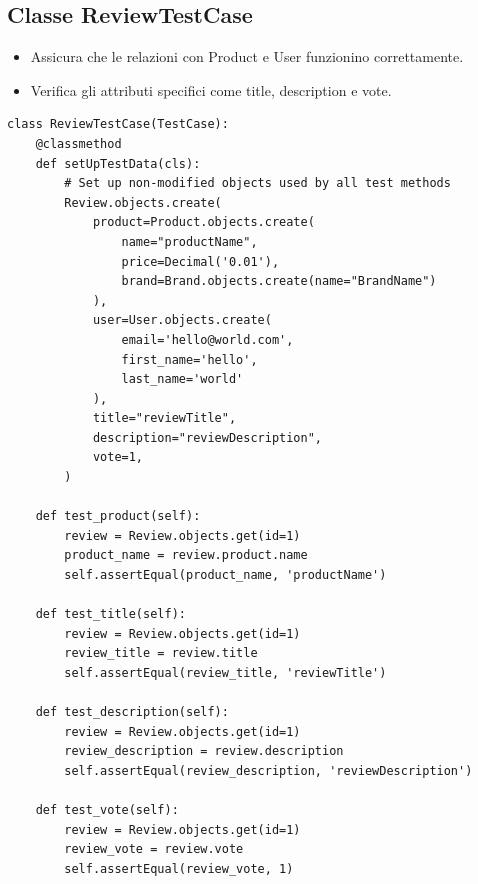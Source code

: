 \subsection{Classe ReviewTestCase}
\begin{itemize}
    \item Assicura che le relazioni con Product e User funzionino correttamente.
    \item Verifica gli attributi specifici come title, description e vote.
\end{itemize}
\begin{listing}[!ht]
\begin{verbatim}
class ReviewTestCase(TestCase):
    @classmethod
    def setUpTestData(cls):
        # Set up non-modified objects used by all test methods
        Review.objects.create(
            product=Product.objects.create(
                name="productName",
                price=Decimal('0.01'),
                brand=Brand.objects.create(name="BrandName")
            ),
            user=User.objects.create(
                email='hello@world.com',
                first_name='hello',
                last_name='world'
            ),
            title="reviewTitle",
            description="reviewDescription",
            vote=1,
        )

    def test_product(self):
        review = Review.objects.get(id=1)
        product_name = review.product.name
        self.assertEqual(product_name, 'productName')

    def test_title(self):
        review = Review.objects.get(id=1)
        review_title = review.title
        self.assertEqual(review_title, 'reviewTitle')

    def test_description(self):
        review = Review.objects.get(id=1)
        review_description = review.description
        self.assertEqual(review_description, 'reviewDescription')

    def test_vote(self):
        review = Review.objects.get(id=1)
        review_vote = review.vote
        self.assertEqual(review_vote, 1)
\end{verbatim}
\end{listing}
\clearpage

